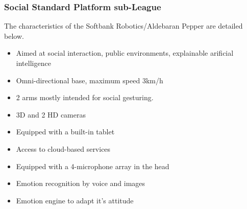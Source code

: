 \subsubsection{Social Standard Platform sub-League}
The characteristics of the Softbank Robotics/Aldebaran Pepper are detailed below. 

\begin{itemize}
    \item Aimed at social interaction, public environments, explainable arificial intelligence
    \item Omni-directional base, maximum speed 3km/h
    \item 2 arms mostly intended for social gesturing. 
    \item 3D and 2 HD cameras
    \item Equipped with a built-in tablet
    \item Access to cloud-based services
    \item Equipped with a 4-microphone array in the head
    \item Emotion recognition by voice and images
    \item Emotion engine to adapt it's attitude
\end{itemize}